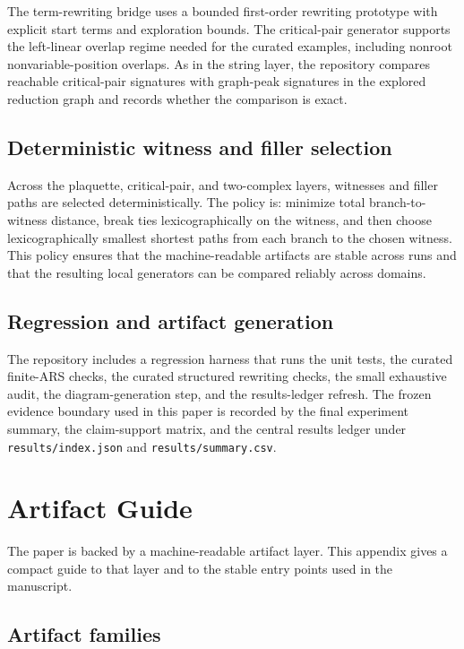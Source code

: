 \documentclass[11pt]{article}
\numberwithin{equation}{section}
\newcommand{\code}[1]{\nolinkurl{#1}}
\theoremstyle{definition}
\theoremstyle{remark}
\begin{document}
The term-rewriting bridge uses a bounded first-order rewriting prototype with explicit start terms and exploration bounds. The critical-pair generator supports the left-linear overlap regime needed for the curated examples, including nonroot nonvariable-position overlaps. As in the string layer, the repository compares reachable critical-pair signatures with graph-peak signatures in the explored reduction graph and records whether the comparison is exact.

\subsection{Deterministic witness and filler selection}

Across the plaquette, critical-pair, and two-complex layers, witnesses and filler paths are selected deterministically. The policy is: minimize total branch-to-witness distance, break ties lexicographically on the witness, and then choose lexicographically smallest shortest paths from each branch to the chosen witness. This policy ensures that the machine-readable artifacts are stable across runs and that the resulting local generators can be compared reliably across domains.

\subsection{Regression and artifact generation}

The repository includes a regression harness that runs the unit tests, the curated finite-ARS checks, the curated structured rewriting checks, the small exhaustive audit, the diagram-generation step, and the results-ledger refresh. The frozen evidence boundary used in this paper is recorded by the final experiment summary, the claim-support matrix, and the central results ledger under \code{results/index.json} and \code{results/summary.csv}.
 \section{Artifact Guide}
\label{app:artifact-guide}

The paper is backed by a machine-readable artifact layer. This appendix gives a compact guide to that layer and to the stable entry points used in the manuscript.

\subsection{Artifact families}
\end{document}
